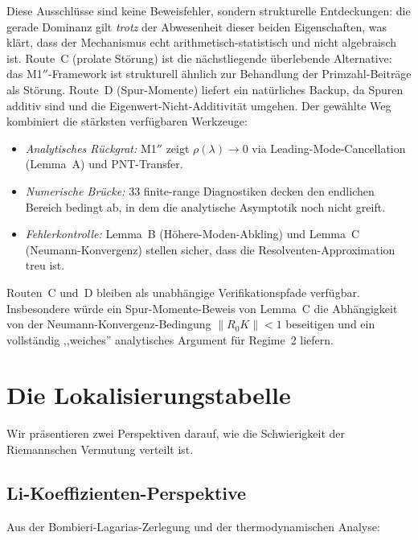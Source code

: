 \documentclass[12pt,a4paper]{article}
\theoremstyle{definition}
\theoremstyle{remark}
\begin{document}
Diese Ausschlüsse sind keine Beweisfehler, sondern strukturelle Entdeckungen: die gerade Dominanz gilt \emph{trotz} der Abwesenheit dieser beiden Eigenschaften, was klärt, dass der Mechanismus echt arithmetisch-statistisch und nicht algebraisch ist. Route~C (prolate Störung) ist die nächstliegende überlebende Alternative: das M1$''$-Framework ist strukturell ähnlich zur Behandlung der Primzahl-Beiträge als Störung. Route~D (Spur-Momente) liefert ein natürliches Backup, da Spuren additiv sind und die Eigenwert-Nicht-Additivität umgehen. Der gewählte Weg kombiniert die stärksten verfügbaren Werkzeuge:

\begin{itemize}
  \item \emph{Analytisches Rückgrat:} M1$''$ zeigt $\rho(\lambda) \to 0$ via Leading-Mode-Cancellation (Lemma~A) und PNT-Transfer.
  \item \emph{Numerische Brücke:} 33 finite-range Diagnostiken decken den endlichen Bereich bedingt ab, in dem die analytische Asymptotik noch nicht greift.
  \item \emph{Fehlerkontrolle:} Lemma~B (Höhere-Moden-Abkling) und Lemma~C (Neumann-Konvergenz) stellen sicher, dass die Resolventen-Approximation treu ist.
\end{itemize}

\noindent Routen~C und~D bleiben als unabhängige Verifikationspfade verfügbar. Insbesondere würde ein Spur-Momente-Beweis von Lemma~C die Abhängigkeit von der Neumann-Konvergenz-Bedingung $\|R_0 K\| < 1$ beseitigen und ein vollständig ,,weiches'' analytisches Argument für Regime~2 liefern.


\section{Die Lokalisierungstabelle}
\label{sec:localization}

Wir präsentieren zwei Perspektiven darauf, wie die Schwierigkeit der Riemannschen Vermutung verteilt ist.

\subsection{Li-Koeffizienten-Perspektive}

Aus der Bombieri-Lagarias-Zerlegung und der thermodynamischen Analyse:
\end{document}
